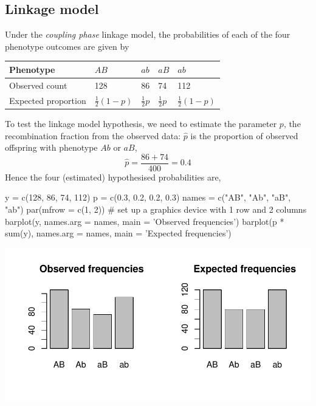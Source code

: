 \documentclass[a4paper]{article}\usepackage[]{graphicx}\usepackage[]{xcolor}
\makeatletter
\def\maxwidth{ %
  \ifdim\Gin@nat@width>\linewidth
    \linewidth
  \else
    \Gin@nat@width
  \fi
}
\makeatother
\begin{document}
\subsection{Linkage model}
Under the \textit{coupling phase} linkage model, the probabilities of each of the four phenotype outcomes are given by
\begin{table}[H]
	\centering
	\begin{tabular}{@{}lllll@{}}
	\textbf{Phenotype} 	& \( AB \)				 & \( ab \) 		  & \( aB \) 		   & \( ab \) 				\\ \midrule
	Observed count		& 128					 & 86				  & 74		 		   & 112					\\ \midrule
	Expected proportion & \( \frac{1}{2}(1-p) \) & \( \frac{1}{2}p \) & \( \frac{1}{2}p \) & \( \frac{1}{2}(1-p) \) \\ 
	\end{tabular}
\end{table}
To test the linkage model hypothesis, we need to estimate the parameter \( p \), the recombination fraction from the observed data: \( \hat{p} \) is the proportion of observed offspring with phenotype \( Ab \) or \( aB \),
\[
	\hat{p} = \frac{86 + 74}{400} = 0.4
\]
Hence the four (estimated) hypothesised probabilities are,
\begin{Schunk}
\begin{Sinput}
y = c(128, 86, 74, 112)
p = c(0.3, 0.2, 0.2, 0.3)
names = c("AB", "Ab", "aB", "ab")
par(mfrow = c(1, 2)) # set up a graphics device with 1 row and 2 columns
barplot(y, names.arg = names, main = 'Observed frequencies')
barplot(p * sum(y), names.arg = names, main = 'Expected frequencies')
\end{Sinput}


{\centering \includegraphics[width=\maxwidth]{figure/listings-unnamed-chunk-26-1} 

}

\end{Schunk}
\end{document}
